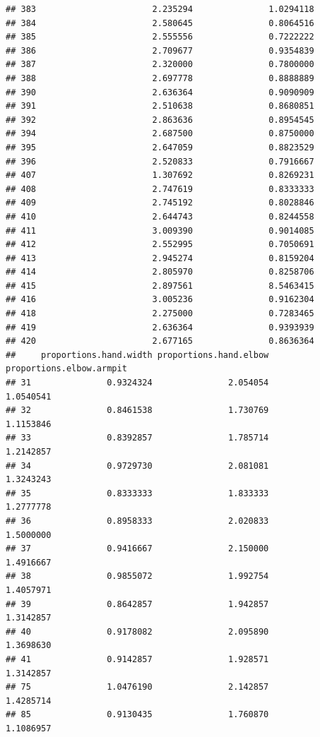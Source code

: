 \documentclass[]{article}
\begin{document}
\begin{verbatim}
## 383                       2.235294               1.0294118
## 384                       2.580645               0.8064516
## 385                       2.555556               0.7222222
## 386                       2.709677               0.9354839
## 387                       2.320000               0.7800000
## 388                       2.697778               0.8888889
## 390                       2.636364               0.9090909
## 391                       2.510638               0.8680851
## 392                       2.863636               0.8954545
## 394                       2.687500               0.8750000
## 395                       2.647059               0.8823529
## 396                       2.520833               0.7916667
## 407                       1.307692               0.8269231
## 408                       2.747619               0.8333333
## 409                       2.745192               0.8028846
## 410                       2.644743               0.8244558
## 411                       3.009390               0.9014085
## 412                       2.552995               0.7050691
## 413                       2.945274               0.8159204
## 414                       2.805970               0.8258706
## 415                       2.897561               8.5463415
## 416                       3.005236               0.9162304
## 418                       2.275000               0.7283465
## 419                       2.636364               0.9393939
## 420                       2.677165               0.8636364
##     proportions.hand.width proportions.hand.elbow proportions.elbow.armpit
## 31               0.9324324               2.054054                1.0540541
## 32               0.8461538               1.730769                1.1153846
## 33               0.8392857               1.785714                1.2142857
## 34               0.9729730               2.081081                1.3243243
## 35               0.8333333               1.833333                1.2777778
## 36               0.8958333               2.020833                1.5000000
## 37               0.9416667               2.150000                1.4916667
## 38               0.9855072               1.992754                1.4057971
## 39               0.8642857               1.942857                1.3142857
## 40               0.9178082               2.095890                1.3698630
## 41               0.9142857               1.928571                1.3142857
## 75               1.0476190               2.142857                1.4285714
## 85               0.9130435               1.760870                1.1086957

\end{verbatim}
\end{document}
